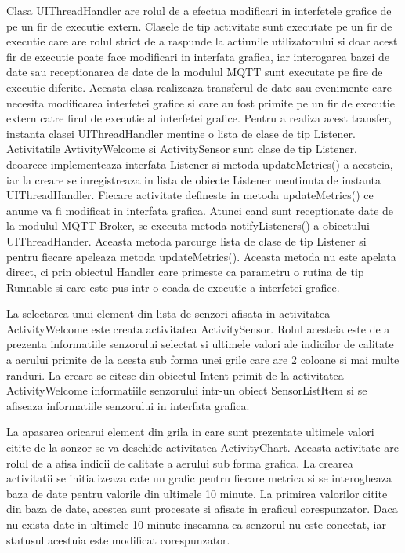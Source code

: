 Clasa UIThreadHandler are rolul de a efectua modificari in interfetele grafice de pe un fir de executie extern. Clasele de tip activitate sunt executate pe un fir de executie 
care are rolul strict de a raspunde la actiunile utilizatorului si doar acest fir de executie poate face modificari in interfata grafica, iar interogarea bazei de date sau 
receptionarea de date de la modulul MQTT sunt executate pe fire de executie diferite. Aceasta clasa realizeaza transferul de date sau evenimente care necesita modificarea 
interfetei grafice si care au fost primite pe un fir de executie extern catre firul de executie al interfetei grafice. Pentru a realiza acest transfer, instanta clasei  
UIThreadHandler mentine o lista de clase de tip Listener. Activitatile AvtivityWelcome si ActivitySensor sunt clase de tip Listener, deoarece implementeaza interfata 
Listener si metoda updateMetrics() a acesteia, iar la creare se inregistreaza in lista de obiecte Listener mentinuta de instanta UIThreadHandler. Fiecare activitate 
defineste in metoda updateMetrics() ce anume va fi modificat in interfata grafica. Atunci cand sunt receptionate date de la modulul MQTT Broker, se executa metoda 
notifyListeners() a obiectului UIThreadHander. Aceasta metoda parcurge lista de clase de tip Listener si pentru fiecare apeleaza metoda updateMetrics(). Aceasta metoda nu este 
apelata direct, ci prin obiectul Handler care primeste ca parametru o rutina de tip Runnable si care este pus intr-o coada de executie a interfetei grafice.

La selectarea unui element din lista de senzori afisata in activitatea ActivityWelcome este creata activitatea ActivitySensor. Rolul acesteia este de a prezenta informatiile 
senzorului selectat si ultimele valori ale indicilor de calitate a aerului primite de la acesta sub forma unei grile care are 2 coloane si mai multe randuri. La creare 
se citesc din obiectul Intent primit de la activitatea ActivityWelcome informatiile senzorului intr-un obiect SensorListItem si se afiseaza informatiile senzorului in 
interfata grafica. 

La apasarea oricarui element din grila in care sunt prezentate ultimele valori citite de la sonzor se va deschide activitatea ActivityChart. Aceasta activitate are rolul 
de a afisa indicii de calitate a aerului sub forma grafica. La crearea activitatii se initializeaza cate un grafic pentru fiecare metrica si se interogheaza baza de date 
pentru valorile din ultimele 10 minute. La primirea valorilor citite din baza de date, acestea sunt procesate si afisate in graficul corespunzator. Daca nu exista date 
in ultimele 10 minute inseamna ca senzorul nu este conectat, iar statusul acestuia este modificat corespunzator.

